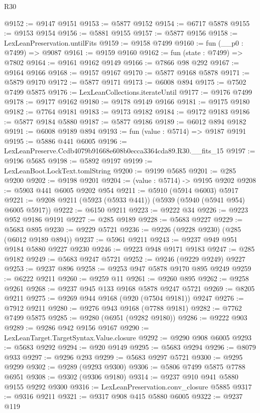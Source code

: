 \begin{lexlean}{R30}
\begin{coremodule}
@9152 := @9147 @9151
@9153 := @5877 @9152
@9154 := @6717 @5878
@9155 := @9153 @9154
@9156 := @5881 @9155
@9157 := @5877 @9156
@9158 := LexLeanPreservation.untilFits
@9159 := @9158 @7499
@9160 := fun (__p0 : @7499) => @9087
@9161 := @9159 @9160
@9162 := fun (state : @7499) => @7802
@9164 := @9161 @9162 @9149
@9166 := @7866 @98 @292
@9167 := @9164 @9166
@9168 := @9157 @9167
@9170 := @5877 @9168 @5878
@9171 := @5879 @9170
@9172 := @5877 @9171
@9173 := @6008 @894
@9175 := @7502 @7499 @5875
@9176 := LexLeanCollections.iterateUntil
@9177 := @9176 @7499
@9178 := @9177 @9162
@9180 := @9178 @9149 @9166
@9181 := @9175 @9180
@9182 := @7764 @9181
@9183 := @9173 @9182
@9184 := @9172 @9183
@9186 := @5877 @9184 @5880
@9187 := @5877 @9186
@9189 := @6012 @894 @9182
@9191 := @6008 @9189 @894
@9193 := fun (value : @5714) => @9187 @9191
@9195 := @5886 @441 @6005
@9196 := LexLeanPreserve.Ccdb4079b91668e608b0ecca3364cda89.R30.__fits_15
@9197 := @9196 @5685
@9198 := @5892 @9197
@9199 := LexLeanBoot.LockText.tomlString
@9200 := @9199 @5685
@9201 := @285 @9200
@9202 := @9198 @9201
@9204 := (value : @5714) -> @9195 @9202
@9208 := @5903 @441 @6005 @9202 @954
@9211 := @5910 (@5914 @6003) @5917
@9221 := @9208 @9211 (@5923 (@5933 @441)) (@5939 (@5940 (@5941 @954) @6005 @5917))
@9222 := @6150 @9211
@9223 := @9222 @34
@9226 := @9223 @952 @9186 @9191
@9227 := @285 @9189
@9228 := @5683 @9227
@9229 := @5683 @895
@9230 := @9229 @5721
@9236 := @9226 (@9228 @9230) (@285 (@6012 @9189 @894))
@9237 := @5961 @9211
@9243 := @9237 @949 @951 @9184 @5880 @9227 @9230
@9246 := @9223 @948 @9171 @9183
@9247 := @285 @9182
@9249 := @5683 @9247 @5721
@9252 := @9246 (@9229 @9249) @9227
@9253 := @9237 @896
@9258 := @9253 @947 @5878 @9170 @895 @9249
@9259 := @6222 @9211
@9260 := @9259 @11
@9261 := @9260 @895
@9262 := @9258 @9261
@9268 := @9237 @945 @133 @9168 @5878 @9247 @5721
@9269 := @8205 @9211
@9275 := @9269 @944 @9168 (@920 (@7504 @9181)) @9247
@9276 := @7912 @9211
@9280 := @9276 @943 @9168 (@7788 @9181)
@9282 := @7762 @7499 @5875
@9285 := @9280 (@6951 (@9282 @9180))
@9286 := @9222 @903
@9289 := @9286 @942 @9156 @9167
@9290 := LexLeanTarget.TargetSyntax.Value.closure
@9292 := @9290 @908 @6005
@9293 := @5683 @9292
@9294 := @920 @9149
@9295 := @5683 @9294
@9296 := @8079 @933
@9297 := @9296 @293
@9299 := @5683 @9297 @5721
@9300 := @9295 @9299
@9302 := @9289 (@9293 @9300)
@9306 := @5806 @7499 @5875 @7788 @6951
@9308 := @9302 (@9306 @9180)
@9314 := @9237 @910 @941 @5880 @9155 @9292 @9300
@9316 := LexLeanPreservation.conv_closure @5885
@9317 := @9316 @9211
@9321 := @9317 @908 @415 @5880 @6005
@9322 := @9237 @119

\end{coremodule}
\end{lexlean}
